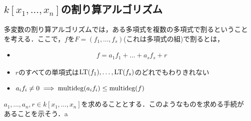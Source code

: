 \documentclass[9pt]{ltjsarticle}
\begin{document}
\subsection{$k[x_1,\dots,x_n]$の割り算アルゴリズム}
多変数の割り算アルゴリズムでは，ある多項式を複数の多項式で割るということを考える．ここで，$f$を$F=(f_1,\dots,f_s)$(これは多項式の組)で割るとは，
\begin{itemize}
 \item
\begin{align}
 f = a_1 f_1 + \dots + a_s f_s + r
\end{align}
 \item
$r$のすべての単項式は${\rm LT}(f_1),\dots,{\rm LT}(f_s)$のどれでもわりきれない
 \item $a_i f_i \neq 0 \implies \mathrm{multideg}(a_i f_i) \le \mathrm{multideg}(f)$
\end{itemize}
$a_1,\dots,a_n,r \in k[x_1,\dots,x_n]$を求めることとする．このようなものを求める手続があることを示そう．a
\end{document}
